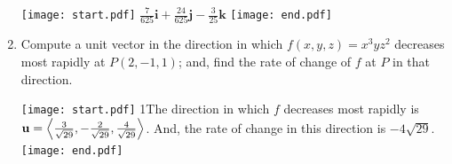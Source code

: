 \documentclass[12pt]{article}
\begin{document}
\begin{enumerate}
\texttt{[image: start.pdf]}
{{$\frac{7}{625}\mathbf{i}+\frac{24}{625}\mathbf{j}-\frac{3}{25}\mathbf{k}$}}
\texttt{[image: end.pdf]}


\item Compute a unit vector in the direction in which $f(x,y,z)=x^3yz^2$ decreases most rapidly at $P(2, -1, 1)$; and, find the rate of change of $f$ at $P$ in that direction.

\texttt{[image: start.pdf]}
{{{1\linewidth}{The direction in which $f$ decreases most rapidly is ${\bf u}=\left\langle \frac{3}{\sqrt{29}},-\frac{2}{\sqrt{29}}, \frac{4}{\sqrt{29}}\right\rangle$.  And, the rate of change in this direction is $-4\sqrt{29}$.}}}
\texttt{[image: end.pdf]}


\end{enumerate}

\end{document}
